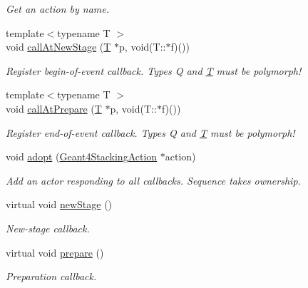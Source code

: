 \begin{DoxyCompactItemize}
\begin{DoxyCompactList}\small\item\em Get an action by name. \end{DoxyCompactList}\item 
{\footnotesize template$<$typename T $>$ }\\void \hyperlink{class_d_d4hep_1_1_simulation_1_1_geant4_stacking_action_sequence_a65b099f0aaec99e83aea53e42f33cfa9}{call\+At\+New\+Stage} (\hyperlink{class_t}{T} $\ast$p, void(T\+::$\ast$f)())
\begin{DoxyCompactList}\small\item\em Register begin-\/of-\/event callback. Types Q and \hyperlink{class_t}{T} must be polymorph! \end{DoxyCompactList}\item 
{\footnotesize template$<$typename T $>$ }\\void \hyperlink{class_d_d4hep_1_1_simulation_1_1_geant4_stacking_action_sequence_a07b58d90b90be4b7bbdcb48f0f80ea56}{call\+At\+Prepare} (\hyperlink{class_t}{T} $\ast$p, void(T\+::$\ast$f)())
\begin{DoxyCompactList}\small\item\em Register end-\/of-\/event callback. Types Q and \hyperlink{class_t}{T} must be polymorph! \end{DoxyCompactList}\item 
void \hyperlink{class_d_d4hep_1_1_simulation_1_1_geant4_stacking_action_sequence_a19b6f7d514d79b40c490226a361d55b4}{adopt} (\hyperlink{class_d_d4hep_1_1_simulation_1_1_geant4_stacking_action}{Geant4\+Stacking\+Action} $\ast$action)
\begin{DoxyCompactList}\small\item\em Add an actor responding to all callbacks. Sequence takes ownership. \end{DoxyCompactList}\item 
virtual void \hyperlink{class_d_d4hep_1_1_simulation_1_1_geant4_stacking_action_sequence_a8077fe558cebbeeef5af0114abab6a55}{new\+Stage} ()
\begin{DoxyCompactList}\small\item\em New-\/stage callback. \end{DoxyCompactList}\item 
virtual void \hyperlink{class_d_d4hep_1_1_simulation_1_1_geant4_stacking_action_sequence_a77ab67508d46a2af265090b04d5a41cb}{prepare} ()
\begin{DoxyCompactList}\small\item\em Preparation callback. \end{DoxyCompactList}\end{DoxyCompactItemize}
